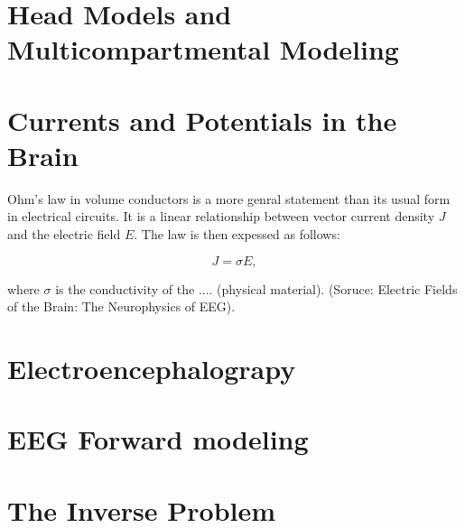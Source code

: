 \documentclass[a4paper, UKenglish, 11pt]{uiomaster}
\begin{document}
\section{Head Models and Multicompartmental Modeling }

\section{Currents and Potentials in the Brain}
Ohm's law in volume conductors is a more genral statement than its usual form in electrical circuits. It is a linear relationship between vector current density $J$ and the electric field $E$. The law is then expessed as follows:

\begin{equation}
J = \sigma E,
\label{eq:ohms_law}
\end{equation}

where $\sigma$ is the conductivity of the .... (physical material). (Soruce: Electric Fields of the Brain: The Neurophysics of EEG).


































\section{Electroencephalograpy}
\section{EEG Forward modeling}
\section{The Inverse Problem}
\end{document}
